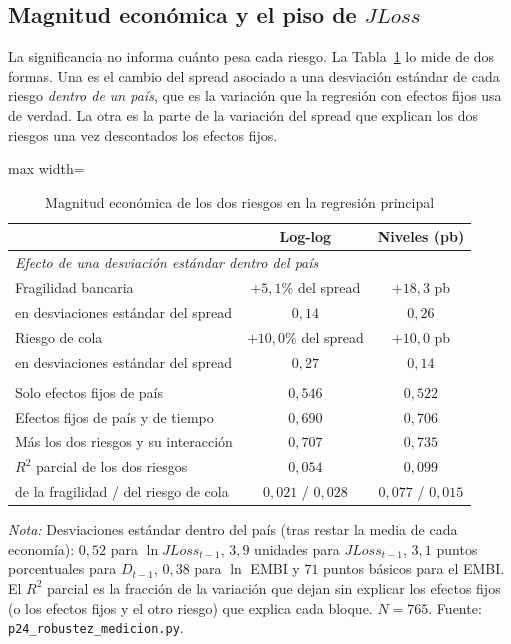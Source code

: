 

\subsection{Magnitud económica y el piso de \texorpdfstring{$JLoss$}{JLoss}}
\label{sec:magnitud}

La significancia no informa cuánto pesa cada riesgo. La Tabla~\ref{tab:magnitud} lo mide de dos formas. Una es el cambio del spread asociado a una desviación estándar de cada riesgo \emph{dentro de un país}, que es la variación que la regresión con efectos fijos usa de verdad. La otra es la parte de la variación del spread que explican los dos riesgos una vez descontados los efectos fijos.

\begin{table}[htbp]
\centering
\small
\caption[Magnitud económica de los dos riesgos]{Magnitud económica de los dos riesgos en la regresión principal}
\label{tab:magnitud}
\begin{adjustbox}{max width=\linewidth}
\begin{tabular}{l cc}
\toprule
 & Log-log & Niveles (pb) \\
\midrule
\multicolumn{3}{l}{\textit{Efecto de una desviación estándar dentro del país}} \\
\quad Fragilidad bancaria & $+5{,}1\%$ del spread & $+18{,}3$ pb \\
\quad \quad en desviaciones estándar del spread & $0{,}14$ & $0{,}26$ \\
\quad Riesgo de cola & $+10{,}0\%$ del spread & $+10{,}0$ pb \\
\quad \quad en desviaciones estándar del spread & $0{,}27$ & $0{,}14$ \\
\addlinespace
\multicolumn{3}{l}{\textit{Variación del spread explicada ($R^2$)}} \\
\quad Solo efectos fijos de país & $0{,}546$ & $0{,}522$ \\
\quad Efectos fijos de país y de tiempo & $0{,}690$ & $0{,}706$ \\
\quad Más los dos riesgos y su interacción & $0{,}707$ & $0{,}735$ \\
\quad $R^2$ parcial de los dos riesgos & $0{,}054$ & $0{,}099$ \\
\quad \quad de la fragilidad / del riesgo de cola & $0{,}021$ / $0{,}028$ & $0{,}077$ / $0{,}015$ \\
\bottomrule
\end{tabular}
\end{adjustbox}
\par\smallskip\parbox{0.95\linewidth}{\footnotesize \textit{Nota:} Desviaciones estándar dentro del país (tras restar la media de cada economía): $0{,}52$ para $\ln JLoss_{t-1}$, $3{,}9$ unidades para $JLoss_{t-1}$, $3{,}1$ puntos porcentuales para $D_{t-1}$, $0{,}38$ para $\ln$ EMBI y $71$ puntos básicos para el EMBI. El $R^2$ parcial es la fracción de la variación que dejan sin explicar los efectos fijos (o los efectos fijos y el otro riesgo) que explica cada bloque. $N=765$. Fuente: \texttt{p24\_robustez\_medicion.py}.}
\end{table}

